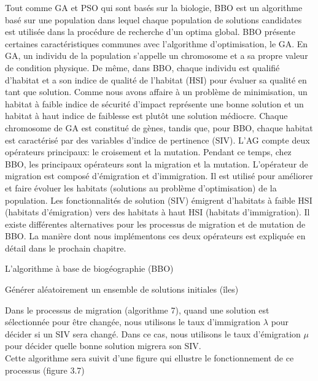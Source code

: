 \begin{enumerate}[label=\alph*)]
Tout comme GA et PSO qui sont basés sur la biologie, BBO est un algorithme basé sur une population dans lequel chaque population de solutions candidates est utilisée dans la procédure de recherche d’un optima global. BBO présente certaines caractéristiques communes avec l’algorithme d'optimisation, le GA. En GA, un individu de la population s'appelle un chromosome et a sa propre valeur de condition physique. De même, dans BBO, chaque individu est qualifié d'habitat et a son indice de qualité de l'habitat (HSI) pour évaluer sa qualité en tant que solution. Comme nous avons affaire à un problème de minimisation, un habitat à faible indice de sécurité d'impact représente une bonne solution et un habitat à haut indice de faiblesse est plutôt une solution médiocre. Chaque chromosome de GA est constitué de gènes, tandis que, pour BBO, chaque habitat est caractérisé par des variables d'indice de pertinence (SIV). L'AG compte deux opérateurs principaux: le croisement et la mutation. Pendant ce temps, chez BBO, les principaux opérateurs sont la migration et la mutation. L'opérateur de migration est composé d'émigration et d'immigration. Il est utilisé pour améliorer et faire évoluer les habitats (solutions au problème d'optimisation) de la population. Les fonctionnalités de solution (SIV) émigrent d'habitats à faible HSI (habitats d'émigration) vers des habitats à haut HSI (habitats d'immigration). Il existe différentes alternatives pour les processus de migration et de mutation de BBO. La manière dont nous implémentons ces deux opérateurs est expliquée en détail dans le prochain chapitre. \\


\begin{algorithm}[H]
\caption{L’algorithme à base de biogéographie (BBO)}
\SetAlgoLined
\DontPrintSemicolon

Générer aléatoirement un ensemble de solutions initiales (îles) \;

\end{algorithm}

Dans le processus de migration (algorithme 7), quand une solution est sélectionnée pour être changée, nous utilisons le taux d'immigration $\lambda$ pour décider si un SIV sera changé. Dans ce cas, nous utilisons le taux d'émigration $\mu$ pour décider quelle bonne solution migrera son SIV.\\
Cette algorithme  sera suivit d’une figure qui ellustre le fonctionnement de ce processus (figure 3.7) \\




\end{enumerate}
